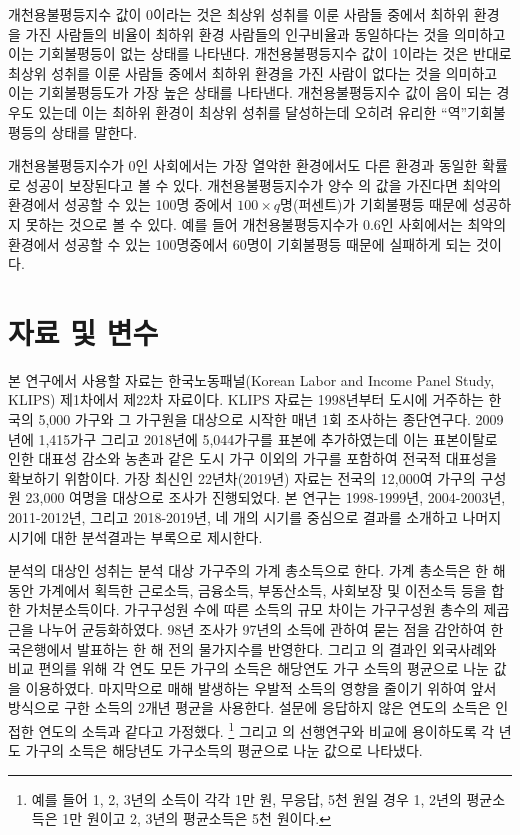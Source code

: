 개천용불평등지수 값이 0이라는 것은 최상위 성취를 이룬 사람들 중에서 최하위 환경을 가진 사람들의 비율이 최하위 환경 사람들의 인구비율과 동일하다는 것을 의미하고 이는 기회불평등이 없는 상태를 나타낸다.
개천용불평등지수 값이 1이라는 것은 반대로 최상위 성취를 이룬 사람들 중에서 최하위 환경을 가진 사람이 없다는 것을 의미하고 이는 기회불평등도가 가장 높은 상태를 나타낸다.
개천용불평등지수 값이 음이 되는 경우도 있는데 이는 최하위 환경이 최상위 성취를 달성하는데 오히려 유리한 ``역''기회불평등의 상태를 말한다.

개천용불평등지수가 0인 사회에서는 가장 열악한 환경에서도 다른 환경과 동일한 확률로 성공이 보장된다고 볼 수 있다.
개천용불평등지수가 양수 의 값을 가진다면 최악의 환경에서 성공할 수 있는 100명 중에서 $100 \times q$명(퍼센트)가 기회불평등 때문에 성공하지 못하는 것으로 볼 수 있다.
예를 들어 개천용불평등지수가 0.6인 사회에서는 최악의 환경에서 성공할 수 있는 100명중에서 60명이 기회불평등 때문에 실패하게 되는 것이다.

\section{자료 및 변수}

본 연구에서 사용할 자료는 한국노동패널(Korean Labor and Income Panel Study, KLIPS) 제1차에서 제22차 자료이다.
KLIPS 자료는 1998년부터 도시에 거주하는 한국의 5,000 가구와 그 가구원을 대상으로 시작한 매년 1회 조사하는 종단연구다.
2009년에 1,415가구 그리고 2018년에 5,044가구를 표본에 추가하였는데 이는 표본이탈로 인한 대표성 감소와 농촌과 같은 도시 가구 이외의 가구를 포함하여 전국적 대표성을 확보하기 위함이다.
가장 최신인 22년차(2019년) 자료는 전국의 12,000여 가구의 구성원 23,000 여명을 대상으로 조사가 진행되었다.
본 연구는 1998-1999년, 2004-2003년, 2011-2012년, 그리고 2018-2019년, 네 개의 시기를 중심으로 결과를 소개하고 나머지 시기에 대한 분석결과는 부록으로 제시한다.

분석의 대상인 성취는 분석 대상 가구주의 가계 총소득으로 한다.
가계 총소득은 한 해 동안 가계에서 획득한 근로소득, 금융소득, 부동산소득, 사회보장 및 이전소득 등을 합한 가처분소득이다.
가구구성원 수에 따른 소득의 규모 차이는 가구구성원 총수의 제곱근을 나누어 균등화하였다.
98년 조사가 97년의 소득에 관하여 묻는 점을 감안하여 한국은행에서 발표하는 한 해 전의 물가지수를 반영한다.
그리고 \citet{letl08}의 결과인 외국사례와 비교 편의를 위해 각 연도 모든 가구의 소득은 해당연도 가구 소득의 평균으로 나눈 값을 이용하였다.
마지막으로 매해 발생하는 우발적 소득의 영향을 줄이기 위하여 앞서 방식으로 구한 소득의 2개년 평균을 사용한다.
설문에 응답하지 않은 연도의 소득은 인접한 연도의 소득과 같다고 가정했다.
\footnote{예를 들어 1, 2, 3년의 소득이 각각 1만 원, 무응답, 5천 원일 경우 1, 2년의 평균소득은 1만 원이고 2, 3년의 평균소득은 5천 원이다.}
그리고 \citet{letl08}의 선행연구와 비교에 용이하도록 각 년도 가구의 소득은 해당년도 가구소득의 평균으로 나눈 값으로 나타냈다.

